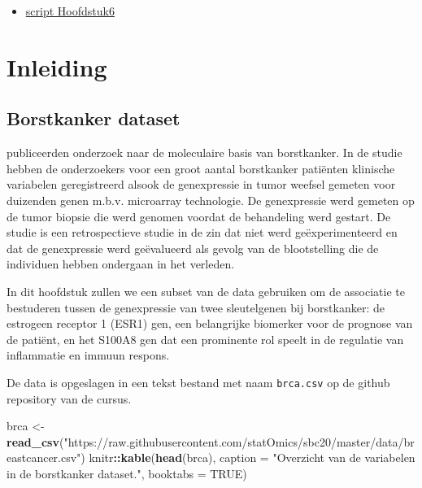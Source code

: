 \documentclass[
  12pt,dutch,coursenotes]{book}
\newenvironment{Shaded}{\begin{snugshade}}{\end{snugshade}}
\newcommand{\DataTypeTok}[1]{\textcolor[rgb]{0.13,0.29,0.53}{#1}}
\newcommand{\KeywordTok}[1]{\textcolor[rgb]{0.13,0.29,0.53}{\textbf{#1}}}
\newcommand{\NormalTok}[1]{#1}
\newcommand{\OperatorTok}[1]{\textcolor[rgb]{0.81,0.36,0.00}{\textbf{#1}}}
\newcommand{\OtherTok}[1]{\textcolor[rgb]{0.56,0.35,0.01}{#1}}
\newcommand{\StringTok}[1]{\textcolor[rgb]{0.31,0.60,0.02}{#1}}
\providecommand{\tightlist}{%
  \setlength{\itemsep}{0pt}\setlength{\parskip}{0pt}}
\theoremstyle{definition}
\theoremstyle{definition}
\theoremstyle{definition}
\theoremstyle{remark}
\begin{document}
\begin{itemize}
\tightlist
\item
  \href{https://statomics.github.io/sbc20/rmd/06-linearRegression.html}{script Hoofdstuk6}
\end{itemize}

\hypertarget{inleiding-5}{%
\section{Inleiding}\label{inleiding-5}}

\hypertarget{borstkanker-dataset}{%
\subsection{Borstkanker dataset}\label{borstkanker-dataset}}

\citet{sotiriou2006} publiceerden onderzoek naar de moleculaire basis van borstkanker.
In de studie hebben de onderzoekers voor een groot aantal borstkanker patiënten klinische variabelen geregistreerd alsook de genexpressie in tumor weefsel gemeten voor duizenden genen m.b.v. microarray technologie.
De genexpressie werd gemeten op de tumor biopsie die werd genomen voordat de behandeling werd gestart.
De studie is een retrospectieve studie in de zin dat niet werd geëxperimenteerd en dat de genexpressie werd geëvalueerd als gevolg van de blootstelling die de individuen hebben ondergaan in het verleden.

In dit hoofdstuk zullen we een subset van de data gebruiken om de associatie te bestuderen tussen de genexpressie van twee sleutelgenen bij borstkanker: de estrogeen receptor 1 (ESR1) gen, een belangrijke biomerker voor de prognose van de patiënt, en het S100A8 gen dat een prominente rol speelt in de regulatie van inflammatie en immuun respons.

De data is opgeslagen in een tekst bestand met naam \texttt{brca.csv} op de github repository van de cursus.

\begin{Shaded}
\begin{Highlighting}[]
\NormalTok{brca \textless{}{-}}\StringTok{ }\KeywordTok{read\_csv}\NormalTok{(}\StringTok{"https://raw.githubusercontent.com/statOmics/sbc20/master/data/breastcancer.csv"}\NormalTok{)}
\NormalTok{knitr}\OperatorTok{::}\KeywordTok{kable}\NormalTok{(}\KeywordTok{head}\NormalTok{(brca), }\DataTypeTok{caption =} \StringTok{"Overzicht van de variabelen in de borstkanker dataset."}\NormalTok{, }
    \DataTypeTok{booktabs =} \OtherTok{TRUE}\NormalTok{)}
\end{Highlighting}
\end{Shaded}
\end{document}
